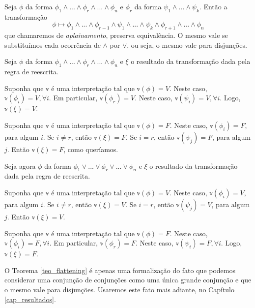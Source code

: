 \begin{theorem}
	\label{teo_flattening}
	Seja $\phi$ da forma $\phi_1 \wedge ... \wedge \phi_r \wedge ... \wedge \phi_n$ e $\phi_r$ da forma $\psi_1 \wedge ... \wedge \psi_k$. Então a transformação $$\phi \longmapsto \phi_1 \wedge ... \wedge \phi_{r-1} \wedge \psi_1 \wedge ... \wedge \psi_k \wedge \phi_{r+1} \wedge ... \wedge \phi_n$$ que chamaremos de \emph{aplainamento}, preserva equivalência. O mesmo vale se substituímos cada ocorrência de $\wedge$ por $\vee$, ou seja, o mesmo vale para disjunções.
\end{theorem}

\begin{prova}
Seja $\phi$ da forma $\phi_1 \wedge ... \wedge \phi_r \wedge ... \wedge \phi_n$ e $\xi$ o resultado da transformação dada pela regra de reescrita.

Suponha que $\mathbb{v}$ é uma interpretação tal que $\mathbb{v}(\phi) = V$. Neste caso, $\mathbb{v}(\phi_i) = V, \forall i$. Em particular, $\mathbb{v}(\phi_r) = V$. Neste caso, $\mathbb{v}(\psi_i) = V, \forall i$. Logo, $\mathbb{v}(\xi) = V$.

Suponha que $\mathbb{v}$ é uma interpretação tal que $\mathbb{v}(\phi) = F$. Neste caso, $\mathbb{v}(\phi_i) = F$, para algum $i$. Se $i \neq r$, então $\mathbb{v}(\xi) = F$. Se $i = r$, então $\mathbb{v}(\psi_j) = F$, para algum $j$. Então $\mathbb{v}(\xi) = F$, como queríamos.

Seja agora $\phi$ da forma $\phi_1 \vee ... \vee \phi_r \vee ... \vee \phi_n$ e $\xi$ o resultado da transformação dada pela regra de reescrita.

Suponha que $\mathbb{v}$ é uma interpretação tal que $\mathbb{v}(\phi) = V$. Neste caso, $\mathbb{v}(\phi_i) = V$, para algum $i$. Se $i \neq r$, então $\mathbb{v}(\xi) = V$. Se $i = r$, então $\mathbb{v}(\psi_j) = V$, para algum $j$. Então $\mathbb{v}(\xi) = V$.

Suponha que $\mathbb{v}$ é uma interpretação tal que $\mathbb{v}(\phi) = F$. Neste caso, $\mathbb{v}(\phi_i) = F, \forall i$. Em particular, $\mathbb{v}(\phi_r) = F$. Neste caso, $\mathbb{v}(\psi_i) = F, \forall i$. Logo, $\mathbb{v}(\xi) = F$.
\end{prova}

O Teorema \ref{teo_flattening} é apenas uma formalização do fato que podemos considerar uma conjunção de conjunções como uma única grande conjunção e que o mesmo vale para disjunções. Usaremos este fato mais adiante, no Capítulo \ref{cap_resultados}.

